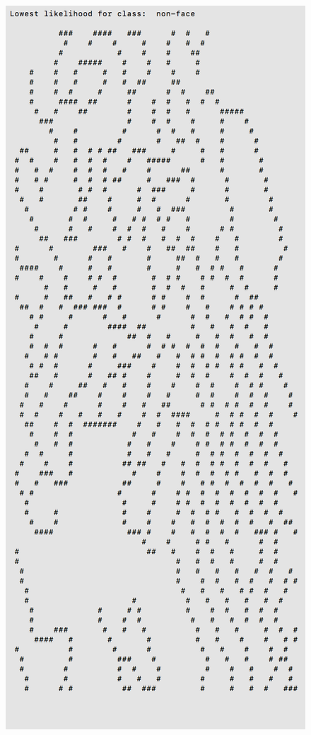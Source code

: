 \documentclass[11pt]{article}
\begin{document}
\begin{center}
\includegraphics[scale=0.6]{part1/extra/low_nonface.png}
\end{center}

\pagebreak
\end{document}
